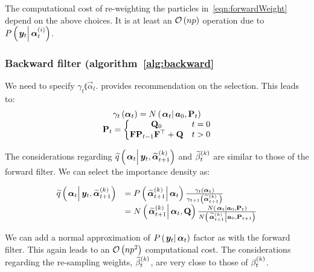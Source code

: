 The computational cost of re-weighting the particles in~\eqref{eqn:forwardWeight} depend on the above choices. It is at least an $\mathcal{O}\left( np\right)$ operation due to $\propC{\vec{y}_t}{\partic{\vec{\alpha}}{t}{i}}$.

\subsubsection*{Backward filter (algorithm~\ref{alg:backward}}
We need to specify $\gamma_t\Lparen{\vec{\alpha}_t}$. \citet[page 69 and 70]{briers10} provides recommendation on the selection. This leads to:
\begin{equation}\begin{matrix}
	\gamma_t\Lparen{\vec{\alpha}_t} =
		\normalC{\vec{\alpha}_t}{\vec{a}_0}{\mat{P}_t} \\
%
	\mat{P}_t = \left\{
		\begin{matrix} \mat{Q}_0 & t = 0 \\ \mat{F}\mat{P}_{t - 1}\mat{F}^\top + \mat{Q} & t > 0   \end{matrix} \right.
\end{matrix}\end{equation}

The considerations regarding $\IDAproxC{\vec{\alpha}_t}{\vec{y}_t, \particB{\vec{\alpha}}{t + 1}{k}}$ and $\widetilde{\beta}_{t}^{\left( k\right)}$ are similar to those of the forward filter. We can select the importance density as:

\begin{equation}\begin{array}{cl}
	\IDAproxC{\vec{\alpha}_t}{\vec{y}_t, \particB{\vec{\alpha}}{t + 1}{k}}  &= %
		\propC{\particB{\vec{\alpha}}{t + 1}{k}}{\vec{\alpha}_t}
		\frac{\gamma_t\Lparen{\vec{\alpha}_t}}{\gamma_{t + 1}\Lparen{\particB{\vec{\alpha}}{t + 1}{k}}} \\
	& = \normalC{\particB{\vec{\alpha}}{t + 1}{k}}{\vec{\alpha}_t}{\mat{Q}}
		\frac{
			\normalC{\vec{\alpha}_t}{\vec{a}_0}{\mat{P}_t}
		}{ %
			\normalC{\particB{\vec{\alpha}}{t + 1}{k}}{\vec{a}_0}{\mat{P}_{t + 1}}
		}
\end{array}\end{equation}

We can add a normal approximation of $\propC{\vec{y}_t}{\vec{\alpha}_t}$ factor as with the forward filter. This again leads to an $\mathcal{O}\left( np^2\right)$ computational cost. The considerations regarding the re-sampling weights, $\widetilde{\beta}_{t}^{\left( k\right)}$, are very close to those of $\beta_{t}^{\left( k\right)}$.

